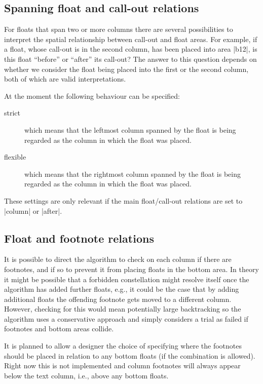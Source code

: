 \documentclass[twocolumn]{article}
\begin{document}
\subsection{Spanning float and call-out relations} \label{fl-span-relation}

For floats that span two or more columns there are several
possibilities to interpret the spatial relationship between call-out
and float areas. For example, if a float, whose call-out is in the
second column, has been placed into area |b12|, is this float
``before'' or ``after'' its call-out? The answer to this question
depends on whether we consider the float being placed into the first
or the second column, both of which are valid interpretations.

At the moment the following behaviour can be specified:
\begin{description}
\item[strict] which means that the leftmost column spanned
  by the float is being regarded as the column in which the float was placed.
\item[flexible] which means that the rightmost column spanned 
  by the float is being regarded as the column in which the float was placed.
\end{description}
These settings are only relevant if the main float/call-out relations
are set to |column| or |after|.


\subsection{Float and footnote relations}

It is possible to direct the algorithm to check on each column if
there are footnotes, and if so to prevent it from placing floats in
the bottom 
area. In theory it might be possible that a forbidden constellation
might resolve itself once the algorithm has added further floats,
e.g., it could be the case that by adding additional floats the
offending footnote gets moved to a different column. However, checking
for this would mean potentially large backtracking so the algorithm
uses a conservative approach and simply considers a trial as failed if
footnotes and bottom areas collide.

It is planned to allow a designer the choice of specifying where the
footnotes should be placed in relation to any bottom floats (if the
combination is allowed). Right now this is not implemented and
column footnotes will always appear below the text column, i.e., above
any bottom floats.
\end{document}
